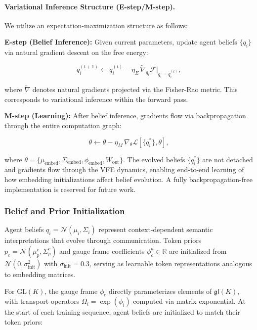 \documentclass[twoside,11pt]{article}
\begin{document}
\paragraph{Variational Inference Structure (E-step/M-step).}
We utilize an expectation-maximization structure as follows:

\textbf{E-step (Belief Inference):} Given current parameters, update agent beliefs $\{q_i\}$ via natural gradient descent on the free energy:

\begin{equation}
q_i^{(t+1)} \leftarrow q_i^{(t)} - \eta_E \, \tilde{\nabla}_{q_i} \mathcal{F}\big|_{q_i = q_i^{(t)}},
\end{equation}

where $\tilde{\nabla}$ denotes natural gradients projected via the Fisher-Rao metric. This corresponds to variational inference within the forward pass.

\textbf{M-step (Learning):} After belief inference, gradients flow via backpropagation through the entire computation graph:

\begin{equation}
\theta \leftarrow \theta - \eta_M \, \nabla_{\theta} \mathcal{L}[\{q_i^*\}, \theta],
\end{equation}

where $\theta = \{\mu_{\text{embed}}, \Sigma_{\text{embed}}, \phi_{\text{embed}}, W_{\text{out}}\}$. The evolved beliefs $\{q_i^*\}$ are not detached and gradients flow through the VFE dynamics, enabling end-to-end learning of how embedding initializations affect belief evolution. A fully backpropagation-free implementation is reserved for future work.

\subsubsection{Belief and Prior Initialization}

Agent beliefs $q_i = \mathcal{N}(\mu_i, \Sigma_i)$ represent context-dependent semantic interpretations that evolve through communication. Token priors $p_c = \mathcal{N}(\mu_p^c, \Sigma_p^c)$ and gauge frame coefficients $\phi_c^a \in \mathbb{R}$ are initialized from $\mathcal{N}(0, \sigma_{\text{init}}^2)$ with $\sigma_{\text{init}} = 0.3$, serving as learnable token representations analogous to embedding matrices.

For $\mathrm{GL}(K)$, the gauge frame $\phi_c$ directly parameterizes elements of $\mathfrak{gl}(K)$, with transport operators $\Omega_i = \exp(\phi_i)$ computed via matrix exponential. At the start of each training sequence, agent beliefs are initialized to match their token priors:
\end{document}
